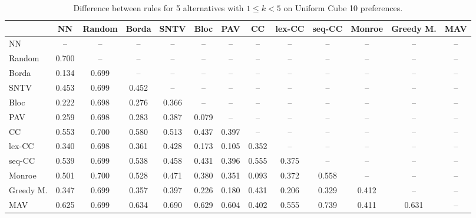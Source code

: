 
\begin{table*}[h!]
\centering
\begin{tabular}{lcccccccccccc}
\toprule
 & NN & Random & Borda & SNTV & Bloc & PAV & CC & lex-CC & seq-CC & Monroe & Greedy M. & MAV \\
\midrule
NN & -- & -- & -- & -- & -- & -- & -- & -- & -- & -- & -- & -- \\
Random & 0.700 & -- & -- & -- & -- & -- & -- & -- & -- & -- & -- & -- \\
Borda & 0.134 & 0.699 & -- & -- & -- & -- & -- & -- & -- & -- & -- & -- \\
SNTV & 0.453 & 0.699 & 0.452 & -- & -- & -- & -- & -- & -- & -- & -- & -- \\
Bloc & 0.222 & 0.698 & 0.276 & 0.366 & -- & -- & -- & -- & -- & -- & -- & -- \\
PAV & 0.259 & 0.698 & 0.283 & 0.387 & 0.079 & -- & -- & -- & -- & -- & -- & -- \\
CC & 0.553 & 0.700 & 0.580 & 0.513 & 0.437 & 0.397 & -- & -- & -- & -- & -- & -- \\
lex-CC & 0.340 & 0.698 & 0.361 & 0.428 & 0.173 & 0.105 & 0.352 & -- & -- & -- & -- & -- \\
seq-CC & 0.539 & 0.699 & 0.538 & 0.458 & 0.431 & 0.396 & 0.555 & 0.375 & -- & -- & -- & -- \\
Monroe & 0.501 & 0.700 & 0.528 & 0.471 & 0.380 & 0.351 & 0.093 & 0.372 & 0.558 & -- & -- & -- \\
Greedy M. & 0.347 & 0.699 & 0.357 & 0.397 & 0.226 & 0.180 & 0.431 & 0.206 & 0.329 & 0.412 & -- & -- \\
MAV & 0.625 & 0.699 & 0.634 & 0.690 & 0.629 & 0.604 & 0.402 & 0.555 & 0.739 & 0.411 & 0.631 & -- \\
\bottomrule
\end{tabular}

\caption{Difference between rules for 5 alternatives with $1 \leq k < 5$ on Uniform Cube 10 preferences.}
\end{table*}
